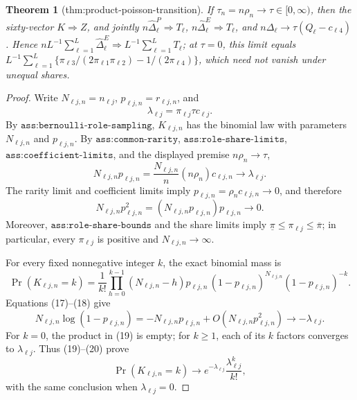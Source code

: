 \documentclass{article}
\newtheorem{theorem}{Theorem}
\begin{document}
\begin{theorem}[thm:product-poisson-transition]\label{thm:product-poisson-transition}
If \(\tau_n=n\rho_n\to\tau\in[0,\infty)\), then the sixty-vector \(K\Rightarrow Z\), and jointly \(n\widehat\Delta^P_{\ell}\Rightarrow T_{\ell}\), \(n\widehat\Delta^E_{\ell}\Rightarrow T_{\ell}\), and \(n\Delta_{\ell}\to\tau(Q_{\ell}-c_{\ell4})\). Hence \(nL^{-1}\sum_{\ell=1}^{L}\widehat\Delta^E_{\ell}\Rightarrow L^{-1}\sum_{\ell=1}^{L}T_{\ell}\); at \(\tau=0\), this limit equals \(L^{-1}\sum_{\ell=1}^{L}\{\pi_{\ell3}/(2\pi_{\ell1}\pi_{\ell2})-1/(2\pi_{\ell4})\}\), which need not vanish under unequal shares.
\end{theorem}
\begin{proof}
Write \(N_{\ell j,n}=n_{\ell j}\), \(p_{\ell j,n}=r_{\ell j,n}\), and
\[
\lambda_{\ell j}=\pi_{\ell j}\tau c_{\ell j}.
\]
By \(\texttt{ass:bernoulli-role-sampling}\), \(K_{\ell j,n}\) has the binomial law with parameters \(N_{\ell j,n}\) and \(p_{\ell j,n}\).  By \(\texttt{ass:common-rarity}\), \(\texttt{ass:role-share-limits}\), \(\texttt{ass:coefficient-limits}\), and the displayed premise \(n\rho_n\to\tau\),
\[
N_{\ell j,n}p_{\ell j,n}
=\frac{N_{\ell j,n}}n(n\rho_n)c_{\ell j,n}
\longrightarrow\lambda_{\ell j}.
\tag{17}
\]
The rarity limit and coefficient limits imply \(p_{\ell j,n}=\rho_nc_{\ell j,n}\to0\), and therefore
\[
N_{\ell j,n}p_{\ell j,n}^2
=(N_{\ell j,n}p_{\ell j,n})p_{\ell j,n}\longrightarrow0.
\tag{18}
\]
Moreover, \(\texttt{ass:role-share-bounds}\) and the share limits imply
\(\underline\pi\leq\pi_{\ell j}\leq\overline\pi\); in particular, every \(\pi_{\ell j}\) is positive and \(N_{\ell j,n}\to\infty\).

For every fixed nonnegative integer \(k\), the exact binomial mass is
\[
\Pr(K_{\ell j,n}=k)
=\frac1{k!}\prod_{h=0}^{k-1}(N_{\ell j,n}-h)p_{\ell j,n}
\,(1-p_{\ell j,n})^{N_{\ell j,n}}(1-p_{\ell j,n})^{-k}.
\tag{19}
\]
Equations (17)--(18) give
\[
N_{\ell j,n}\log(1-p_{\ell j,n})
=-N_{\ell j,n}p_{\ell j,n}+O(N_{\ell j,n}p_{\ell j,n}^2)
\longrightarrow-\lambda_{\ell j}.
\tag{20}
\]
For \(k=0\), the product in (19) is empty; for \(k\geq1\), each of its \(k\) factors converges to \(\lambda_{\ell j}\).  Thus (19)--(20) prove
\[
\Pr(K_{\ell j,n}=k)
\longrightarrow e^{-\lambda_{\ell j}}\frac{\lambda_{\ell j}^k}{k!},
\tag{21}
\]
with the same conclusion when \(\lambda_{\ell j}=0\).


\end{proof}
\end{document}
